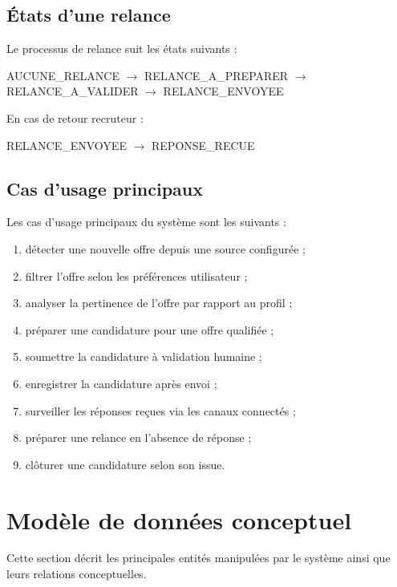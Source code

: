 \documentclass[11pt,a4paper]{article}
\begin{document}
\subsection{États d’une relance}

Le processus de relance suit les états suivants :

\begin{center}
AUCUNE\_RELANCE $\rightarrow$ RELANCE\_A\_PREPARER
$\rightarrow$ RELANCE\_A\_VALIDER
$\rightarrow$ RELANCE\_ENVOYEE
\end{center}

En cas de retour recruteur :

\begin{center}
RELANCE\_ENVOYEE $\rightarrow$ REPONSE\_RECUE
\end{center}

\subsection{Cas d’usage principaux}

Les cas d’usage principaux du système sont les suivants :

\begin{enumerate}
    \item détecter une nouvelle offre depuis une source configurée ;
    \item filtrer l’offre selon les préférences utilisateur ;
    \item analyser la pertinence de l’offre par rapport au profil ;
    \item préparer une candidature pour une offre qualifiée ;
    \item soumettre la candidature à validation humaine ;
    \item enregistrer la candidature après envoi ;
    \item surveiller les réponses reçues via les canaux connectés ;
    \item préparer une relance en l’absence de réponse ;
    \item clôturer une candidature selon son issue.
\end{enumerate}

\section{Modèle de données conceptuel}

Cette section décrit les principales entités manipulées par le système ainsi que leurs relations conceptuelles.
\end{document}

